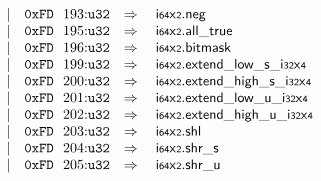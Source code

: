 $$\begin{array}[t]{@{}lrrl@{}l@{}l@{}l@{}}
& & | & \mathtt{0xFD}~~193{:}{\mathtt{u32}} & \quad\Rightarrow\quad{} & {\mathsf{i{\scriptstyle 64}}}{\mathsf{x}}{\mathsf{{\scriptstyle 2}}} {.} \mathsf{neg} \\
& & | & \mathtt{0xFD}~~195{:}{\mathtt{u32}} & \quad\Rightarrow\quad{} & {\mathsf{i{\scriptstyle 64}}}{\mathsf{x}}{\mathsf{{\scriptstyle 2}}} {.} \mathsf{all\_true} \\
& & | & \mathtt{0xFD}~~196{:}{\mathtt{u32}} & \quad\Rightarrow\quad{} & {\mathsf{i{\scriptstyle 64}}}{\mathsf{x}}{\mathsf{{\scriptstyle 2}}}{.}\mathsf{bitmask} \\
& & | & \mathtt{0xFD}~~199{:}{\mathtt{u32}} & \quad\Rightarrow\quad{} & {\mathsf{i{\scriptstyle 64}}}{\mathsf{x}}{\mathsf{{\scriptstyle 2}}} {.} {{\mathsf{extend}}{\mathsf{\_}}{\mathsf{low}}{\mathsf{\_}}{\mathsf{s}}}{\mathsf{\_}}{{\mathsf{i{\scriptstyle 32}}}{\mathsf{x}}{\mathsf{{\scriptstyle 4}}}} \\
& & | & \mathtt{0xFD}~~200{:}{\mathtt{u32}} & \quad\Rightarrow\quad{} & {\mathsf{i{\scriptstyle 64}}}{\mathsf{x}}{\mathsf{{\scriptstyle 2}}} {.} {{\mathsf{extend}}{\mathsf{\_}}{\mathsf{high}}{\mathsf{\_}}{\mathsf{s}}}{\mathsf{\_}}{{\mathsf{i{\scriptstyle 32}}}{\mathsf{x}}{\mathsf{{\scriptstyle 4}}}} \\
& & | & \mathtt{0xFD}~~201{:}{\mathtt{u32}} & \quad\Rightarrow\quad{} & {\mathsf{i{\scriptstyle 64}}}{\mathsf{x}}{\mathsf{{\scriptstyle 2}}} {.} {{\mathsf{extend}}{\mathsf{\_}}{\mathsf{low}}{\mathsf{\_}}{\mathsf{u}}}{\mathsf{\_}}{{\mathsf{i{\scriptstyle 32}}}{\mathsf{x}}{\mathsf{{\scriptstyle 4}}}} \\
& & | & \mathtt{0xFD}~~202{:}{\mathtt{u32}} & \quad\Rightarrow\quad{} & {\mathsf{i{\scriptstyle 64}}}{\mathsf{x}}{\mathsf{{\scriptstyle 2}}} {.} {{\mathsf{extend}}{\mathsf{\_}}{\mathsf{high}}{\mathsf{\_}}{\mathsf{u}}}{\mathsf{\_}}{{\mathsf{i{\scriptstyle 32}}}{\mathsf{x}}{\mathsf{{\scriptstyle 4}}}} \\
& & | & \mathtt{0xFD}~~203{:}{\mathtt{u32}} & \quad\Rightarrow\quad{} & {\mathsf{i{\scriptstyle 64}}}{\mathsf{x}}{\mathsf{{\scriptstyle 2}}} {.} \mathsf{shl} \\
& & | & \mathtt{0xFD}~~204{:}{\mathtt{u32}} & \quad\Rightarrow\quad{} & {\mathsf{i{\scriptstyle 64}}}{\mathsf{x}}{\mathsf{{\scriptstyle 2}}} {.} {\mathsf{shr}}{\mathsf{\_}}{\mathsf{s}} \\
& & | & \mathtt{0xFD}~~205{:}{\mathtt{u32}} & \quad\Rightarrow\quad{} & {\mathsf{i{\scriptstyle 64}}}{\mathsf{x}}{\mathsf{{\scriptstyle 2}}} {.} {\mathsf{shr}}{\mathsf{\_}}{\mathsf{u}} \\

\end{array}$$
